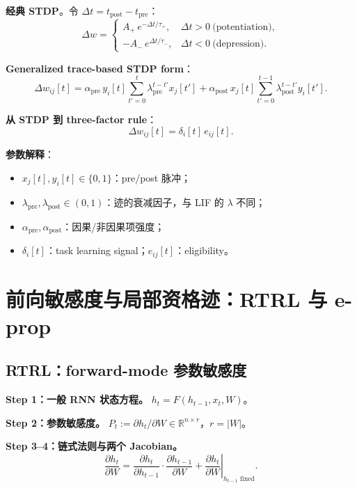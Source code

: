\documentclass[journal,12pt,onecolumn]{IEEEtran}
\begin{document}
\textbf{经典 STDP}。令 $\Delta t=t_{\mathrm{post}}-t_{\mathrm{pre}}$：
\begin{equation}
\Delta w=
\begin{cases}
A_+\,e^{-\Delta t/\tau_+}, & \Delta t>0\ \text{(potentiation)},\\[2mm]
-A_-\,e^{\Delta t/\tau_-}, & \Delta t<0\ \text{(depression)}.
\end{cases}
\end{equation}

\textbf{Generalized trace-based STDP form}：
\begin{equation}
\Delta w_{ij}[t]
=
\alpha_{\mathrm{pre}}\,y_i[t]\sum_{t'=0}^{t}\lambda_{\mathrm{pre}}^{t-t'}x_j[t']
+
\alpha_{\mathrm{post}}\,x_j[t]\sum_{t'=0}^{t-1}\lambda_{\mathrm{post}}^{t-t'}y_i[t'].
\end{equation}

\textbf{从 STDP 到 three-factor rule}：
\begin{equation}
\Delta w_{ij}[t]=\delta_i[t]\,e_{ij}[t].
\end{equation}

\textbf{参数解释}：
\begin{itemize}[leftmargin=1.5em,itemsep=0pt]
\item $x_j[t],y_i[t]\in\{0,1\}$：pre/post 脉冲；
\item $\lambda_{\mathrm{pre}},\lambda_{\mathrm{post}}\in(0,1)$：迹的衰减因子，与 LIF 的 $\lambda$ 不同；
\item $\alpha_{\mathrm{pre}},\alpha_{\mathrm{post}}$：因果/非因果项强度；
\item $\delta_i[t]$：task learning signal；$e_{ij}[t]$：eligibility。
\end{itemize}

\section{前向敏感度与局部资格迹：RTRL 与 e-prop}

\subsection{RTRL：forward-mode 参数敏感度}

\textbf{Step 1：一般 RNN 状态方程。} $h_t=F(h_{t-1},x_t,W)$。

\textbf{Step 2：参数敏感度。} $P_t:=\partial h_t/\partial W\in\mathbb R^{n\times r}$，$r=|W|$。

\textbf{Step 3--4：链式法则与两个 Jacobian。}
\begin{equation}
\frac{\partial h_t}{\partial W}
=
\frac{\partial h_t}{\partial h_{t-1}}\cdot\frac{\partial h_{t-1}}{\partial W}
+
\left.\frac{\partial h_t}{\partial W}\right|_{h_{t-1}\text{ fixed}}.
\end{equation}
\end{document}
